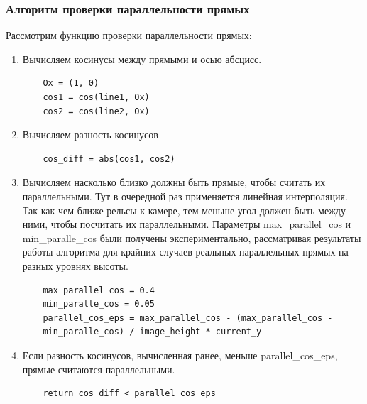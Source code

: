 \subsubsection{Алгоритм проверки параллельности прямых}
Рассмотрим функцию проверки параллельности прямых:
\begin{enumerate}
	\item Вычисляем косинусы между прямыми и осью абсцисс.
	\begin{lstlisting}
	Ox = (1, 0)
	cos1 = cos(line1, Ox)
	cos2 = cos(line2, Ox)
	\end{lstlisting}
	\item Вычисляем разность косинусов
	\begin{lstlisting}
	cos_diff = abs(cos1, cos2)
	\end{lstlisting}
	\item Вычисляем насколько близко должны быть прямые, чтобы считать их параллельными. Тут в очередной раз применяется линейная интерполяция. Так как чем ближе рельсы к камере, тем меньше угол должен быть между ними, чтобы посчитать их параллельными. Параметры max\_parallel\_cos и min\_paralle\_cos были получены экспериментально, рассматривая результаты работы алгоритма для крайних случаев 
	реальных параллельных прямых на разных уровнях высоты.
	\begin{lstlisting}
	max_parallel_cos = 0.4
	min_paralle_cos = 0.05
	parallel_cos_eps = max_parallel_cos - (max_parallel_cos - 
	min_paralle_cos) / image_height * current_y
	\end{lstlisting}
	\item Если разность косинусов, вычисленная ранее, меньше parallel\_cos\_eps, прямые считаются параллельными.
	\begin{lstlisting}
	return cos_diff < parallel_cos_eps
	\end{lstlisting}
\end{enumerate}              
